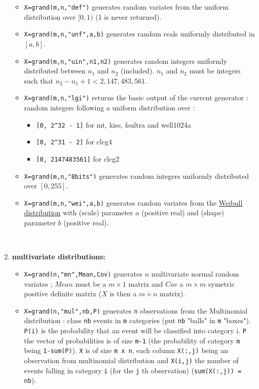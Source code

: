 \begin{enumerate}
\begin{itemize}
\item {} \verb!X=grand(m,n,"def")! generates random variates from the uniform 
  distribution over $[0,1)$ (1 is never returned).

\item {} \verb!X=grand(m,n,"unf",a,b)! generates random reals uniformly distributed 
    in $[a, b]$.

\item {} \verb!X=grand(m,n,"uin",n1,n2)! generates random integers uniformly 
      distributed between $n_1$ and $n_2$ (included). $n_1$ and $n_2$ must be integers such that 
      $n_2-n_1+1 < 2,147,483,561$.

\item {} \verb!X=grand(m,n,"lgi")! returns the basic output of the current generator : random integers  
      following a uniform distribution over : 
      \begin{itemize}
      \item \verb![0, 2^32 - 1]! for mt, kiss, fsultra and well1024a
      \item \verb![0, 2^31 - 2]! for clcg4
      \item \verb![0, 2147483561]! for clcg2
      \end{itemize}

\item {} \verb!X=grand(m,n,"8bits")! generates random integers uniformly 
      distributed over $[0,255]$.
  
\item {} 
  \verb!X=grand(m,n,"wei",a,b)! generates random variates from the  \hyperlink{weipdf}{Weibull 
  distribution} with (scale) parameter $a$ (positive real) and (shape) parameter $b$ (positive real).
\end{itemize}

~~~~

\item {\bf multivariate distributions:}
\begin{itemize}
\item {}
  \verb!X=grand(n,"mn",Mean,Cov)! generates  $n$ multivariate normal random variates ; 
  $Mean$ must be a $m \times 1$ matrix and $Cov$ a  $m \times m$ 
  symetric positive definite matrix  ($X$ is then a  $m \times n$
  matrix).

\item {} 
   \verb!X=grand(n,"mul",nb,P)! generates \verb!n! observations from the Multinomial 
  distribution :  class \verb!nb! events in \verb!m! categories (put \verb!nb!
  "balls" in \verb!m! "boxes"). \verb!P(i)! is the probability 
  that an event will be classified into category i. \verb!P! the vector of probabilities
  is of size  \verb!m-1! (the probability of category \verb!m! being \verb!1-sum(P)!).
  \verb!X! is of size \verb!m x n!, each column \verb!X(:,j)! being an observation 
  from multinomial distribution and \verb!X(i,j)! the number of events falling in category 
  \verb!i! (for the \verb!j! th observation) (\verb!sum(X(:,j)) = nb!).
  

\end{itemize}
\end{enumerate}
